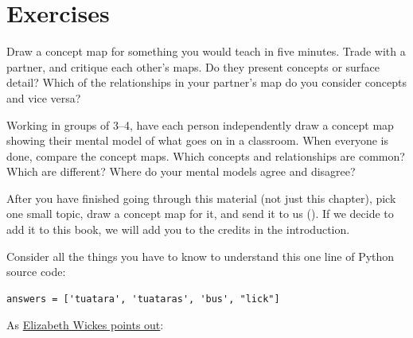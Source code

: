\section{Exercises}\label{s:memory-exercises}


Draw a concept map for something you would teach in five minutes.
Trade with a partner, and critique each other's maps. Do they present
concepts or surface detail?  Which of the relationships in your
partner's map do you consider concepts and vice versa?


Working in groups of 3--4, have each person independently draw a
concept map showing their mental model of what goes on in a classroom.
When everyone is done, compare the concept maps.  Which concepts and
relationships are common?  Which are different?  Where do your mental
models agree and disagree?


After you have finished going through this material (not just this
chapter), pick one small topic, draw a concept map for it, and send it
to us ().  If we decide to add it to this book, we
will add you to the credits in the introduction.


Consider all the things you have to know to understand this one line of
Python source code:

\begin{verbatim}
answers = ['tuatara', 'tuataras', 'bus', "lick"]
\end{verbatim}

\noindent
As \href{https://twitter.com/elliewix/status/981285432922202113}{Elizabeth Wickes points out}:

